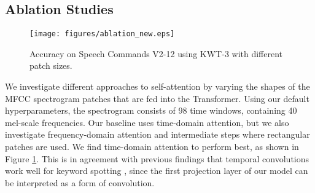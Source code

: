 \documentclass[a4paper]{article}
\begin{document}
\begin{table}[t]
\footnotesize
  \caption{Accuracy on Speech Commands V1 \cite{speechv1} and V2 \cite{speechv2}.}
  \label{tab:results}
  \centering
\end{table}

\subsection{Ablation Studies}

\begin{figure}[b]
  \centering
  \texttt{[image: figures/ablation\_new.eps]}
  \caption{Accuracy on Speech Commands V2-12 using KWT-3 with different patch sizes.}
  \label{fig:ablation}
\end{figure}

We investigate different approaches to self-attention by varying the shapes of the MFCC spectrogram patches that are fed into the Transformer. Using our default hyperparameters, the spectrogram consists of 98 time windows, containing 40 mel-scale frequencies. Our baseline uses time-domain attention, but we also investigate frequency-domain attention and intermediate steps where rectangular patches are used. We find time-domain attention to perform best, as shown in Figure \ref{fig:ablation}. This is in agreement with previous findings that temporal convolutions work well for keyword spotting \cite{choi2019temporal}, since the first projection layer of our model can be interpreted as a form of convolution.
\end{document}
